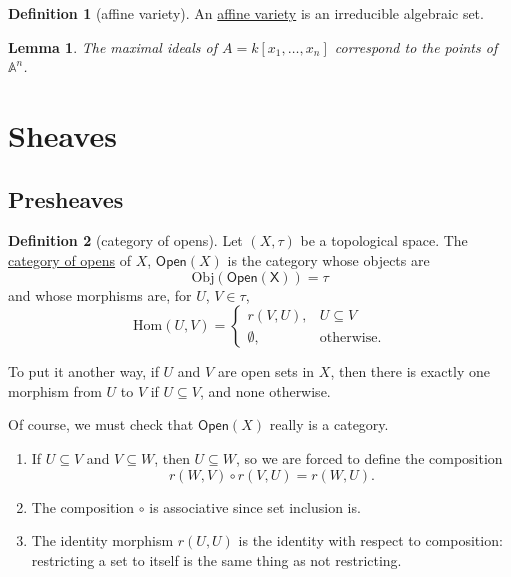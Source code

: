 \documentclass[a4paper,10pt]{scrreprt}
\newcommand{\defn}[1]{\ul{#1}}
\newcommand{\Obj}{\mathrm{Obj}}
\newcommand{\Hom}{\mathrm{Hom}}
\theoremstyle{definition}
\newtheorem{definition}{Definition}[section]
\theoremstyle{plain}
\newtheorem{lemma}{Lemma}[section]
\theoremstyle{remark}
\begin{document}
\begin{definition}[affine variety]
  \label{def:affinevariety}
  An \defn{affine variety} is an irreducible algebraic set.
\end{definition}

\begin{lemma}
  The maximal ideals of $A = k[x_{1}, \ldots, x_{n}]$ correspond to the points of $\mathbb{A}^{n}$.
\end{lemma}

\section{Sheaves}
\subsection{Presheaves}

\begin{definition}[category of opens] 
  \label{def:opencategory} 
  Let $(X, \tau)$ be a topological space. The \defn{category of opens} of $X$, $\mathsf{Open}(X)$ is the category whose objects are 
  \begin{equation*}
    \Obj(\mathsf{Open(X)}) = \tau 
  \end{equation*} and whose morphisms are, for $U$, $V \in \tau$, 
  \begin{equation*} 
    \Hom(U,V) =
    \begin{cases} 
      r(V,U), & U \subseteq V \\ 
      \emptyset, & \text{otherwise}.  
    \end{cases} 
  \end{equation*}

  To put it another way, if $U$ and $V$ are open sets in $X$, then there is exactly one morphism from $U$ to $V$ if $U \subseteq V$, and none otherwise.
\end{definition}

Of course, we must check that $\mathsf{Open}(X)$ really is a category.
\begin{enumerate} 
  \item If $U \subseteq V$ and $V \subseteq W$, then $U \subseteq W$, so we are forced to define the composition 
    \begin{equation*} 
      r(W,V) \circ r(V,U) = r(W,U).  
    \end{equation*} 
  \item The composition $\circ$ is associative since set inclusion is.

  \item The identity morphism $r(U,U)$ is the identity with respect to composition: restricting a set to itself is the same thing as not restricting.  
\end{enumerate}
\end{document}
